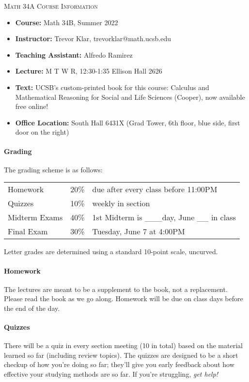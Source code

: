 \documentclass[a4paper,12pt]{article}
\begin{document}
\begin{center} {\Large \scshape Math 34A Course Information}
\end{center}

\vspace{0.75cm}

\begin{itemize}
\item {\bf Course:} Math 34B, Summer 2022
\item {\bf Instructor:} Trevor Klar,  trevorklar@math.ucsb.edu
\item {\bf Teaching Assistant:} Alfredo Ramirez
\item {\bf Lecture:} M T W R, 12:30-1:35 Ellison Hall 2626
\item {\bf Text:} UCSB's custom-printed book for this course: Calculus and Mathematical Reasoning for Social and Life Sciences (Cooper), now available free online!
\item {\bf Office Location:} South Hall 6431X (Grad Tower, 6th floor, blue side, first door on the right)
\end{itemize}

\paragraph{Grading}
The grading scheme is as follows:
\begin{center}
\begin{tabular}{lll}
Homework       & 20\% & due after every class before 11:00PM \\
Quizzes        & 10\% & weekly in section  \\ 
Midterm Exams & 40\% & 1st Midterm is \_\_\_day, June \_\_ in class \\
Final Exam  & 30\% & Tuesday, June 7 at 4:00PM
\end{tabular}
\end{center}
Letter grades are determined using a standard 10-point scale, uncurved.

\paragraph{Homework}
 The lectures are meant to be a supplement to the book, not a replacement. Please read the book as we go along. Homework will be due on class days before the end of the day. 
 
 \paragraph{Quizzes} 
 There will be a quiz in every section meeting (10 in total) based on the material learned so far (including review topics). The quizzes are designed to be a short checkup of how you're doing so far; they'll give you early feedback about how effective your studying methods are so far. If you're struggling, \textit{get help!}
 
\end{document}
